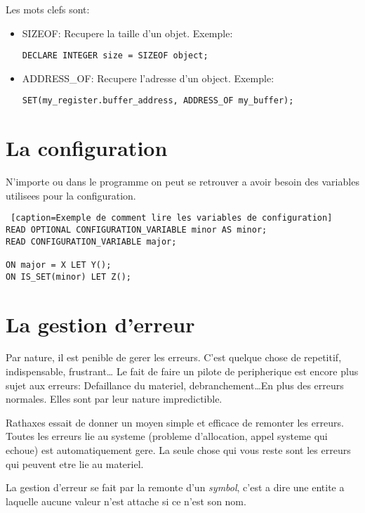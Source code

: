 \documentclass{rtxreport}
\begin{document}
Les mots clefs sont:
\begin{itemize}
	\item SIZEOF: Recupere la taille d'un objet. Exemple:
	\begin{lstlisting}[caption=Exemple du sizeof]
		DECLARE INTEGER size = SIZEOF object;
	\end{lstlisting}

	\item ADDRESS\_OF: Recupere l'adresse d'un object. Exemple:
	\begin{lstlisting}[caption=Exemple du sizeof]
		SET(my_register.buffer_address, ADDRESS_OF my_buffer);
	\end{lstlisting}
\end{itemize}

\section{La configuration}

N'importe ou dans le programme on peut se retrouver a avoir besoin des variables utilisees pour
la configuration.

\begin{lstlisting} [caption=Exemple de comment lire les variables de configuration]
READ OPTIONAL CONFIGURATION_VARIABLE minor AS minor;
READ CONFIGURATION_VARIABLE major;

ON major = X LET Y();
ON IS_SET(minor) LET Z();
\end{lstlisting}

\section{La gestion d'erreur}

Par nature, il est penible de gerer les erreurs. C'est quelque chose de repetitif, indispensable,
frustrant\ldots
Le fait de faire un pilote de peripherique est encore plus sujet aux erreurs:
Defaillance du materiel, debranchement\ldots En plus des erreurs normales.
Elles sont par leur nature impredictible.

Rathaxes essait de donner un moyen simple et efficace de remonter les erreurs.
Toutes les erreurs lie au systeme (probleme d'allocation, appel systeme qui echoue) est
automatiquement gere. La seule chose qui vous reste sont les erreurs qui peuvent etre lie
au materiel.

La gestion d'erreur se fait par la remonte d'un \emph{symbol}, c'est a dire une entite
a laquelle aucune valeur n'est attache si ce n'est son nom.
\end{document}
